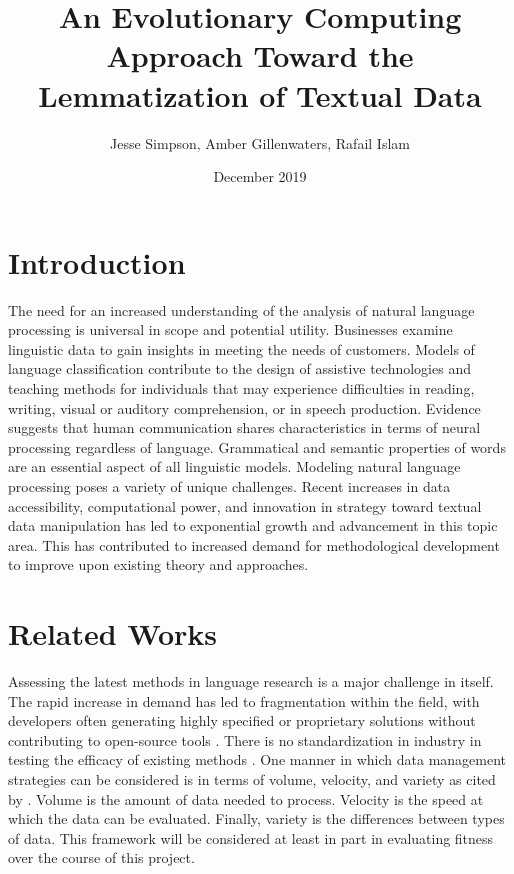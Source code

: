 \documentclass{article}
\title{An Evolutionary Computing Approach Toward the Lemmatization of Textual Data}
\author{Jesse Simpson, Amber Gillenwaters, Rafail Islam}
\date{December 2019}
\begin{document}
\maketitle

\section{Introduction}

The need for an increased understanding of the analysis of natural language processing is universal in scope and potential utility. Businesses examine linguistic data to gain insights in meeting the needs of customers. Models of language classification contribute to the design of assistive technologies and teaching methods for individuals that may experience difficulties in reading, writing, visual or auditory comprehension, or in speech production. Evidence suggests that human communication shares characteristics in terms of neural processing regardless of language. Grammatical and semantic properties of words are an essential aspect of all linguistic models. Modeling natural language processing poses a variety of unique challenges. Recent increases in data accessibility, computational power, and innovation in strategy toward textual data manipulation has led to exponential growth and advancement in this topic area. This has contributed to increased demand for methodological development to improve upon existing theory and approaches. 

\section{Related Works}

Assessing the latest methods in language research is a major challenge in itself. The rapid increase in demand has led to fragmentation within the field, with developers often generating highly specified or proprietary solutions without contributing to open-source tools \citep{landset2015survey}. There is no standardization in industry in testing the efficacy of existing methods \citep{landset2015survey}. One manner in which data management strategies can be considered is in terms of volume, velocity, and variety \citep{laney20013d} as cited by \citep{landset2015survey}. Volume is the amount of data needed to process. Velocity is the speed at which the data can be evaluated. Finally, variety is the differences between types of data. This framework will be considered at least in part in evaluating fitness over the course of this project. 
\end{document}
